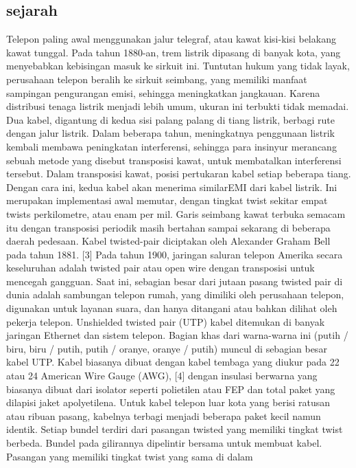 \subsection{sejarah}
Telepon paling awal menggunakan jalur telegraf, atau kawat kisi-kisi belakang kawat tunggal. Pada tahun 1880-an, trem listrik dipasang di banyak kota, 
yang menyebabkan kebisingan masuk ke sirkuit ini. Tuntutan hukum yang tidak layak, perusahaan telepon beralih ke sirkuit seimbang, yang memiliki manfaat 
sampingan pengurangan emisi, sehingga meningkatkan jangkauan. Karena distribusi tenaga listrik menjadi lebih umum, ukuran ini terbukti tidak memadai. 
Dua kabel, digantung di kedua sisi palang palang di tiang listrik, berbagi rute dengan jalur listrik. Dalam beberapa tahun, meningkatnya penggunaan 
listrik kembali membawa peningkatan interferensi, sehingga para insinyur merancang sebuah metode yang disebut transposisi kawat, untuk membatalkan 
interferensi tersebut. Dalam transposisi kawat, posisi pertukaran kabel setiap beberapa tiang. Dengan cara ini, kedua kabel akan menerima similarEMI 
dari kabel listrik. Ini merupakan implementasi awal memutar, dengan tingkat twist sekitar empat twists perkilometre, atau enam per mil. Garis seimbang 
kawat terbuka semacam itu dengan transposisi periodik masih bertahan sampai sekarang di beberapa daerah pedesaan. Kabel twisted-pair diciptakan oleh 
Alexander Graham Bell pada tahun 1881. [3] Pada tahun 1900, jaringan saluran telepon Amerika secara keseluruhan adalah twisted pair atau open wire dengan 
transposisi untuk mencegah gangguan. Saat ini, sebagian besar dari jutaan pasang twisted pair di dunia adalah sambungan telepon rumah, yang dimiliki oleh 
perusahaan telepon, digunakan untuk layanan suara, dan hanya ditangani atau bahkan dilihat oleh pekerja telepon. Unshielded twisted pair (UTP) kabel 
ditemukan di banyak jaringan Ethernet dan sistem telepon. Bagian khas dari warna-warna ini (putih / biru, biru / putih, putih / oranye, oranye / putih) 
muncul di sebagian besar kabel UTP. Kabel biasanya dibuat dengan kabel tembaga yang diukur pada 22 atau 24 American Wire Gauge (AWG), [4] dengan insulasi 
berwarna yang biasanya dibuat dari isolator seperti polietilen atau FEP dan total paket yang dilapisi jaket apolyetilena. Untuk kabel telepon luar kota 
yang berisi ratusan atau ribuan pasang, kabelnya terbagi menjadi beberapa paket kecil namun identik. Setiap bundel terdiri dari pasangan twisted yang 
memiliki tingkat twist berbeda. Bundel pada gilirannya dipelintir bersama untuk membuat kabel. Pasangan yang memiliki tingkat twist yang sama di dalam 
